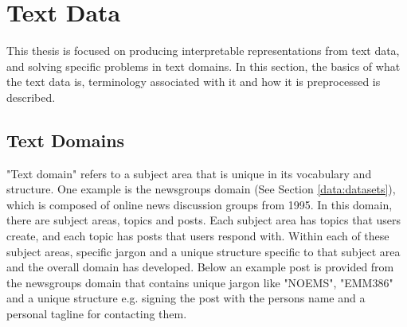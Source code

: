 















\section{Text Data}

This thesis is focused on producing interpretable representations from text data, and solving specific problems in text domains. In this section, the basics of what the text data is, terminology associated with it and how it is preprocessed is described.

\subsection{Text Domains}

"Text domain" refers to a subject area that is unique in its vocabulary and structure. One example is the newsgroups domain (See Section \ref{data:datasets}), which is composed of online news discussion groups from 1995. In this domain, there are subject areas, topics and posts. Each subject area has topics that users create, and each topic has posts that users respond with. Within each of these subject areas, specific jargon and a unique structure specific to that subject area and the overall domain has developed. Below an example post is provided from the newsgroups domain that contains unique jargon like "NOEMS", "EMM386" and a unique structure e.g. signing the post with the persons name and a personal tagline for contacting them.


